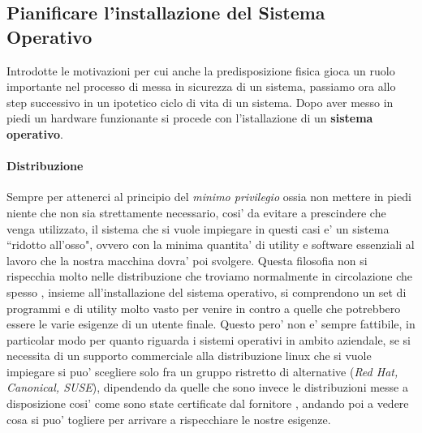 \subsection{Pianificare l'installazione del Sistema Operativo}
Introdotte le motivazioni per cui anche la predisposizione fisica gioca un ruolo importante nel processo di messa in sicurezza di un sistema, passiamo ora allo step successivo in un ipotetico ciclo di vita di un sistema. Dopo aver messo in piedi un hardware funzionante si procede con l'istallazione di un \textbf{sistema operativo}. 

\paragraph{Distribuzione}
Sempre per attenerci al principio del \emph{minimo privilegio} ossia non mettere in piedi niente che non sia strettamente necessario, cosi' da evitare a prescindere che venga utilizzato, il sistema che si vuole impiegare in questi casi e' un sistema ``ridotto all'osso", ovvero con la minima quantita' di utility e software essenziali al lavoro che la nostra macchina dovra' poi svolgere. Questa filosofia non si rispecchia molto nelle distribuzione che troviamo normalmente in circolazione che spesso , insieme all'installazione del sistema operativo, si comprendono un set di programmi e di utility molto vasto per venire in contro a quelle che potrebbero essere le varie esigenze di un utente finale.  Questo pero' non e' sempre fattibile, in particolar modo per quanto riguarda i sistemi operativi in ambito aziendale, se si necessita di un supporto commerciale alla distribuzione linux che si vuole impiegare si puo' scegliere solo fra un gruppo ristretto di alternative (\emph{Red Hat, Canonical, SUSE}), dipendendo da quelle che sono invece le distribuzioni messe a disposizione cosi' come sono state certificate dal fornitore , andando poi a vedere cosa si puo' togliere per arrivare a rispecchiare le nostre esigenze.

